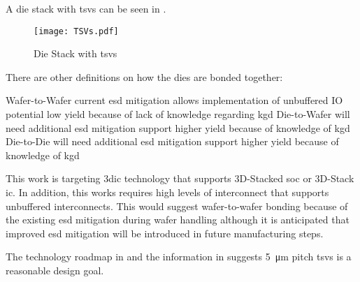 A die stack with \acp{tsv} can be seen in .

\begin{figure}[h]
\centering
\captionsetup{justification=centering}
\captionsetup{width=.9\linewidth}
\centerline{
\mbox{\texttt{[image: TSVs.pdf]}}
}
\caption{Die Stack \cite{itrs2015_interconn} with \acp{tsv}}
\label{fig:tsv}
\end{figure}

There are other definitions on how the dies are bonded together:
\begin{outline}
  \1 Wafer-to-Wafer
    \2 current \ac{esd} mitigation allows implementation of unbuffered IO
    \2 potential low yield because of lack of knowledge regarding \ac{kgd}
  \1 Die-to-Wafer
    \2 will need additional \ac{esd} mitigation support
    \2 higher yield because of knowledge of \ac{kgd}
  \1 Die-to-Die
    \2 will need additional \ac{esd} mitigation support
    \2 higher yield because of knowledge of \ac{kgd}
\end{outline}

This work is targeting \ac{3dic} technology that supports 3D-Stacked \ac{soc} or 3D-Stack \ac{ic}.
In addition, this works requires high levels of interconnect that supports unbuffered interconnects. This would suggest wafer-to-wafer bonding because of the existing \ac{esd} mitigation during wafer handling although it is anticipated that improved \ac{esd} mitigation will be introduced in future manufacturing steps.

The technology roadmap in \cite{itrs2015_interconn} and the information in \cite{patti2014} suggests \SI{5}{\micro\meter} pitch \acp{tsv} is a reasonable design goal.






